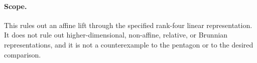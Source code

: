 \paragraph{Scope.}
This rules out an affine lift through the specified rank-four
linear representation. It does not rule out higher-dimensional,
non-affine, relative, or Brunnian representations, and it is not
a counterexample to the pentagon or to the desired comparison.
